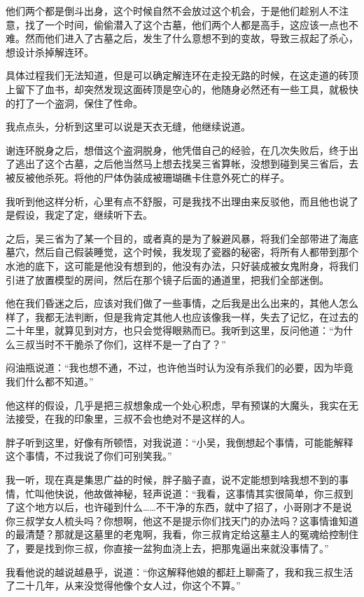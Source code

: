 他们两个都是倒斗出身，这个时候自然不会放过这个机会，于是他们趁别人不注意，找了一个时间，偷偷潜入了这个古墓，他们两个人都是高手，这应该一点也不难。然而他们进入了古墓之后，发生了什么意想不到的变故，导致三叔起了杀心，想设计杀掉解连环。

具体过程我们无法知道，但是可以确定解连环在走投无路的时候，在这走道的砖顶上留下了血书，却突然发现这面砖顶是空心的，他随身必然还有一些工具，就极快的打了一个盗洞，保住了性命。

我点点头，分析到这里可以说是天衣无缝，他继续说道。

谢连环脱身之后，想借这个盗洞脱身，他凭借自己的经验，在几次失败后，终于出了逃出了这个古墓，之后他当然马上想去找吴三省算帐，没想到碰到吴三省后，去被反被他杀死。将他的尸体伪装成被珊瑚礁卡住意外死亡的样子。

我听到他这样分析，心里有点不舒服，可是我找不出理由来反驳他，而且他也说了是假设，我定了定，继续听下去。

之后，吴三省为了某一个目的，或者真的是为了躲避风暴，将我们全部带进了海底墓穴，然后自己假装睡觉，这个时候，我发现了瓷器的秘密，将所有人都带到那个水池的底下，这可能是他没有想到的，他没有办法，只好装成被女鬼附身，将我们引进了放置模型的房间，然后在那个镜子后面的通道里，把我们全部迷倒。

他在我们昏迷之后，应该对我们做了一些事情，之后我是出么出来的，其他人怎么样了，我都无法判断，但是我肯定其他人也应该像我一样，失去了记忆，在过去的二十年里，就算见到对方，也只会觉得眼熟而已。我听到这里，反问他道：“为什么三叔当时不干脆杀了你们，这样不是一了白了？”

闷油瓶说道：“我也想不通，不过，也许他当时认为没有杀我们的必要，因为毕竟我们什么都不知道。”

他这样的假设，几乎是把三叔想象成一个处心积虑，早有预谋的大魔头，我实在无法接受，在我的印象里，三叔不会也绝对不是这样的人。

胖子听到这里，好像有所顿悟，对我说道：“小吴，我倒想起个事情，可能能解释这个事情，不过我说了你们可别笑我。”

我一听，现在真是集思广益的时候，胖子脑子直，说不定能想到啥我想不到的事情，忙叫他快说，他故做神秘，轻声说道：“我看，这事情其实很简单，你三叔到了这个地方以后，也许碰到什么……不干净的东西，就中了招了，小哥刚才不是说你三叔学女人梳头吗？你想啊，他这不是提示你们找天门的办法吗？这事情谁知道的最清楚？那就是这墓里的老鬼啊，我看，你三叔肯定给这墓主人的冤魂给控制住了，要是找到你三叔，你直接一盆狗血浇上去，把那鬼逼出来就没事情了。”

我看他说的越说越悬乎，说道：“你这解释他娘的都赶上聊斋了，我和我三叔生活了二十几年，从来没觉得他像个女人过，你这个不算。”


